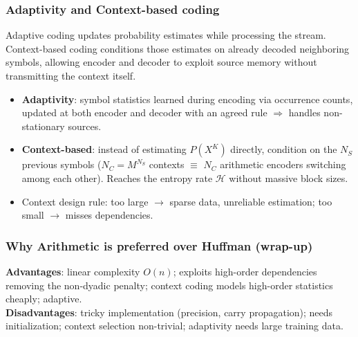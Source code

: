 \subsubsection{Adaptivity and Context-based coding}
Adaptive coding updates probability estimates while processing the stream. Context-based coding conditions those estimates on already decoded neighboring symbols, allowing encoder and decoder to exploit source memory without transmitting the context itself.
\begin{itemize}
    \item \textbf{Adaptivity}: symbol statistics learned during encoding via occurrence counts, updated at both encoder and decoder with an agreed rule $\Rightarrow$ handles non-stationary sources.
    \item \textbf{Context-based}: instead of estimating $P(X^K)$ directly, condition on the $N_S$ previous symbols ($N_C = M^{N_S}$ contexts $\equiv$ $N_C$ arithmetic encoders switching among each other). Reaches the entropy rate $\mathcal{H}$ without massive block sizes.
    \item Context design rule: too large $\to$ sparse data, unreliable estimation; too small $\to$ misses dependencies.
\end{itemize}
\subsubsection{Why Arithmetic is preferred over Huffman (wrap-up)}
\textbf{Advantages}: linear complexity $O(n)$; exploits high-order dependencies removing the non-dyadic penalty; context coding models high-order statistics cheaply; adaptive.\\
\textbf{Disadvantages}: tricky implementation (precision, carry propagation); needs initialization; context selection non-trivial; adaptivity needs large training data.
